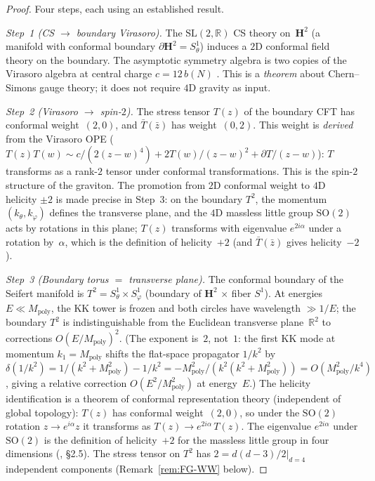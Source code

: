 \begin{proof}
Four steps, each using an established result.

\emph{Step~1 (CS $\to$ boundary Virasoro).}
The $\mathrm{SL}(2,\mathbb{R})$ CS theory on~$\mathbf{H}^2$
(a manifold with conformal boundary $\partial\mathbf{H}^2 = S^1_\theta$)
induces a $2$D conformal field theory on the boundary.
The asymptotic symmetry algebra is two copies of
the Virasoro algebra at central charge $c = 12\,b(N)$
\citep{BrownHenneaux1986}.
This is a \emph{theorem} about Chern--Simons gauge theory;
it does not require $4$D gravity as input.

\emph{Step~2 (Virasoro $\to$ spin-$2$).}
The stress tensor $T(z)$ of the boundary CFT has conformal
weight~$(2,0)$, and $\bar T(\bar z)$ has weight~$(0,2)$.
This weight is \emph{derived} from the Virasoro OPE
($T(z)T(w) \sim c/(2(z{-}w)^4) + 2T(w)/(z{-}w)^2 + \partial T/(z{-}w)$):
$T$ transforms as a rank-$2$ tensor under conformal
transformations.
This is the spin-$2$ structure of the graviton.
The promotion from $2$D conformal weight to $4$D helicity $\pm 2$
is made precise in Step~3: on the boundary $T^2$, the
momentum $(k_\theta, k_\varphi)$ defines the transverse plane,
and the $4$D massless little group $\mathrm{SO}(2)$ acts by
rotations in this plane; $T(z)$ transforms with eigenvalue
$e^{2i\alpha}$ under a rotation by~$\alpha$, which is
the definition of helicity~$+2$
(and $\bar T(\bar z)$ gives helicity~$-2$).

\emph{Step~3 (Boundary torus $=$ transverse plane).}
The conformal boundary of the Seifert manifold is
$T^2 = S^1_\theta \times S^1_\varphi$
(boundary of $\mathbf{H}^2$ $\times$ fiber $S^1$).
At energies $E \ll M_{\mathrm{poly}}$, the KK tower
is frozen and both circles have wavelength
$\gg 1/E$; the boundary $T^2$ is indistinguishable
from the Euclidean transverse plane~$\mathbb{R}^2$
to corrections $O(E/M_{\mathrm{poly}})^2$.
(The exponent is~$2$, not~$1$: the first KK mode
at momentum $k_1 = M_{\mathrm{poly}}$ shifts the
flat-space propagator $1/k^2$ by
$\delta(1/k^2) = 1/(k^2 + M_{\mathrm{poly}}^2) - 1/k^2
= -M_{\mathrm{poly}}^2/(k^2(k^2 + M_{\mathrm{poly}}^2))
= O(M_{\mathrm{poly}}^2/k^4)$, giving a relative
correction $O(E^2/M_{\mathrm{poly}}^2)$ at energy~$E$.)
The helicity identification is a theorem of
conformal representation theory
(independent of global topology):
$T(z)$ has conformal weight~$(2,0)$, so under the
$\mathrm{SO}(2)$ rotation $z \to e^{i\alpha}z$
it transforms as $T(z) \to e^{2i\alpha}\,T(z)$.
The eigenvalue $e^{2i\alpha}$ under $\mathrm{SO}(2)$
is the definition of helicity~$+2$ for the massless
little group in four dimensions
(\citealt{Weinberg1995}, \S2.5).
The stress tensor on $T^2$ has
$2 = d(d{-}3)/2|_{d=4}$ independent components
(Remark~\ref{rem:FG-WW} below).


\end{proof}
